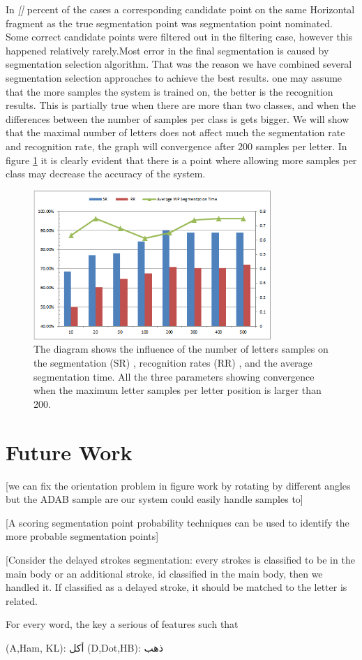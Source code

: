 \documentclass[journal,compsoc]{IEEEtran}
\begin{document}
In \emph{[]} percent of the cases a corresponding candidate point on the same Horizontal fragment as the true segmentation point was  segmentation point nominated. Some correct candidate points were filtered out in the filtering case, however this happened relatively rarely.Most error in the final segmentation is caused by segmentation selection algorithm. That was the reason we have combined several segmentation selection approaches to achieve the best results.
one may assume that the more samples the system is trained on, the better is the recognition results. This is partially true when there are more than two classes, and when the differences between the number of samples per class is gets bigger.
We will show that the maximal number of letters does not affect much the segmentation rate and recognition rate, the graph will convergence after 200 samples per letter. In figure \ref{fig:num_letter_impact} it is clearly evident that there is a point where allowing more samples per class may decrease the accuracy of the system.

\begin{figure}[h]
\centering
\includegraphics[width=9cm]{./figures/num_letter_impact}
\caption{The diagram shows the influence of the number of letters samples on the segmentation (SR) , recognition rates (RR) , and the average segmentation time. All the three parameters showing convergence when the maximum letter samples per letter position is larger than 200. }
\label{fig:num_letter_impact}
\end{figure}


\section{Future Work}
\label{sec:future_work}
[we can fix the orientation problem in figure work by rotating by different angles but the ADAB sample are our system could easily handle samples to]

[A scoring segmentation point probability techniques can be used to identify the more probable segmentation points]

[Consider the delayed strokes segmentation: every strokes is classified to be in the main body or an additional stroke, id classified in the main body, then we handled it. If classified as a delayed stroke, it should be matched to the letter is related.

For every word, the key a serious of features such that

(A,Ham, KL): أكل
(D,Dot,HB): ذهب




\end{document}

